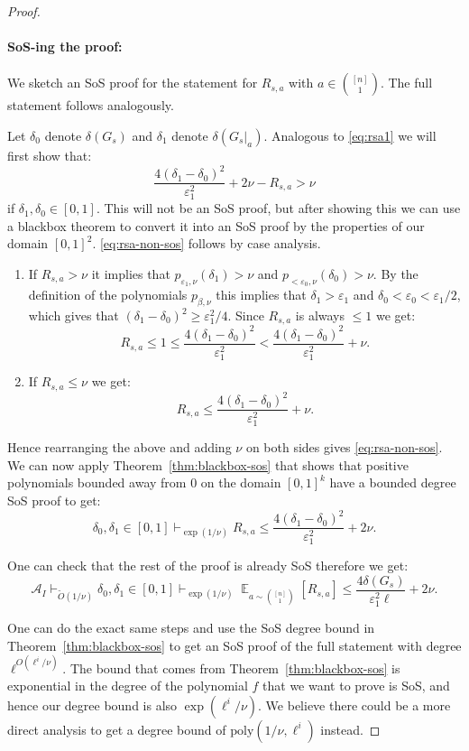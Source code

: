 \documentclass[11pt]{article}
\DeclareMathOperator*{\E}{\mathbb{E}}
\def \cA {\mathcal{A}}
\def \tO {\widetilde{O}}
\def \poly {\mathrm{poly}}
\def \eps {{\varepsilon}}
\theoremstyle{definition}
\begin{document}
\begin{proof}
\paragraph{SoS-ing the proof:} We sketch an SoS proof for the statement for $R_{s,a}$ with $a \in {[n] \choose 1}$. The full statement follows analogously. 

Let $\delta_0$ denote $\delta(G_s)$ and $\delta_1$ denote $\delta(G_s|_a).$ Analogous to \eqref{eq:rsa1} we will first show that:
\begin{equation}\label{eq:rsa-non-sos}
\frac{4(\delta_1 - \delta_0)^2}{\eps_1^2} + 2\nu - R_{s,a} > \nu
\end{equation}
if $\delta_1,\delta_0 \in [0,1]$. This will not be an SoS proof, but after showing this we can use a blackbox theorem to convert it into an SoS proof by the properties of our domain $[0,1]^2$. \eqref{eq:rsa-non-sos} follows by case analysis. 
\begin{enumerate}
    \item If $R_{s,a} > \nu$ it implies that $p_{\eps_1,\nu}(\delta_1) > \nu$ and $p_{<\eps_0,\nu}(\delta_0) > \nu$. By the definition of the polynomials $p_{\beta,\nu}$ this implies that $\delta_1 > \eps_1$ and $\delta_0 < \eps_0 < \eps_1/2$, which gives that $(\delta_1 - \delta_0)^2 \geq \eps_1^2/4$. Since $R_{s,a}$ is always $\leq 1$ we get:
    \[R_{s,a} \leq 1 \leq \frac{4(\delta_1 - \delta_0)^2}{\eps_1^2} < \frac{4(\delta_1 - \delta_0)^2}{\eps_1^2}+\nu.\]
    \item If $R_{s,a} \leq \nu$ we get:
    \[R_{s,a} \leq \frac{4(\delta_1 - \delta_0)^2}{\eps_1^2} + \nu.\]
\end{enumerate}
Hence rearranging the above and adding $\nu$ on both sides gives \eqref{eq:rsa-non-sos}. We can now apply Theorem~\ref{thm:blackbox-sos} that shows that positive polynomials bounded away from $0$ on the domain $[0,1]^k$ have a bounded degree SoS proof to get:
\[\delta_0,\delta_1 \in [0,1] \vdash_{\exp(1/\nu)} R_{s,a} \leq \frac{4(\delta_1 - \delta_0)^2}{\eps_1^2} + 2\nu.\]

One can check that the rest of the proof is already SoS therefore we get:
\[\cA_I \vdash_{\tO(1/\nu)} \delta_0,\delta_1 \in [0,1] \vdash_{\exp(1/\nu)} \E_{a \sim {[n] \choose 1}}[R_{s,a}] \leq \frac{4\delta(G_s)}{\eps_1^2\ell} + 2\nu.\]

One can do the exact same steps and use the SoS degree bound in Theorem~\ref{thm:blackbox-sos} to get an SoS proof of the full statement with degree $\ell^{O(\ell^i/\nu)}$. The bound that comes from Theorem~\ref{thm:blackbox-sos} is exponential in the degree of the polynomial $f$ that we want to prove is SoS, and hence our degree bound is also $\exp(\ell^i/\nu)$. We believe there could be a more direct analysis to get a degree bound of $\poly(1/\nu, \ell^i)$ instead.
\end{proof}
\end{document}
